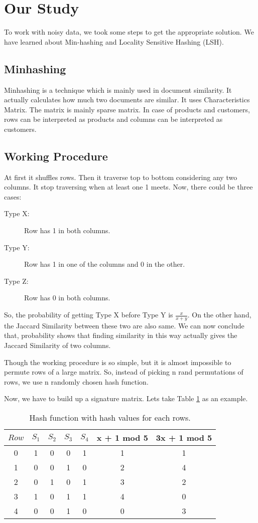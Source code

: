 \documentclass{standalone}
\begin{document}
\section{Our Study}
To work with noisy data, we took some steps to get the appropriate solution. We have learned about Min-hashing and Locality Sensitive Hashing (LSH).

\subsection{Minhashing}
Minhashing is a technique which is mainly used in document similarity\cite{bookOfMinhash}. It actually calculates how much two documents are similar. It uses Characteristics Matrix. The matrix is mainly sparse matrix. In case of products and customers, rows can be interpreted as products and columns can be interpreted as customers.
\subsection{Working Procedure}
At first it shuffles rows. Then it traverse top to bottom considering any two columns. It stop traversing when at least one 1 meets. Now, there could be three cases:
\begin{description}
	\item[Type X:] Row has 1 in both columns.
	\item[Type Y:] Row has 1 in one of the columns and 0 in the other.
	\item[Type Z:] Row has 0 in both columns.
\end{description}
	So, the probability of getting Type X before Type Y is $\frac{x}{x+y}$. On the other hand, the Jaccard Similarity between these two are also same. We can now conclude that, probability shows that finding similarity in this way actually gives the Jaccard Similarity of two columns.

Though the working procedure is so simple, but it is almost impossible to permute rows of a large matrix. So, instead of picking n rand permutations of rows, we use n randomly chosen hash function. 

Now, we have to build up a signature matrix. Lets take Table \ref{tab:minhash} as an example.
\begin{table}[ht]
\centering
\caption{Hash function with hash values for each rows.}
\label{tab:minhash}
\begin{tabular}{c||c|c|c|c||c|c}

$Row$ & $S_1$ & $S_2$ & $S_3$ & $S_4$ &  x + 1 mod 5 &  3x + 1 mod 5 \\ \hline 
0   & 1  & 0  & 0  & 1  & 1  & 1  \\
1   & 0  & 0  & 1  & 0  & 2  & 4  \\
2   & 0  & 1  & 0  & 1  & 3  & 2  \\
3   & 1  & 0  & 1  & 1  & 4  & 0  \\
4   & 0  & 0  & 1  & 0  & 0  & 3 
\end{tabular}
\end{table}
\end{document}
